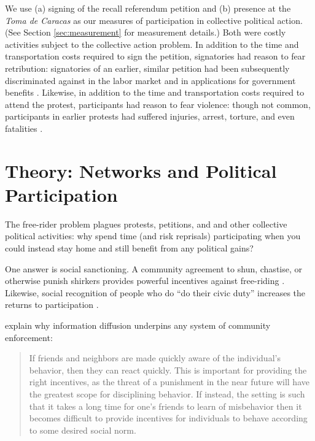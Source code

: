 \documentclass[12pt]{article}
\begin{document}
We use (a) signing of the recall referendum petition and (b) presence at the \emph{Toma de Caracas} as our measures of participation in collective political action. (See Section \ref{sec:measurement} for measurement details.) Both were costly activities subject to the collective action problem. In addition to the time and transportation costs required to sign the petition, signatories had reason to fear retribution: signatories of an earlier, similar petition had been subsequently discriminated against in the labor market \citep{Maisanta} and in applications for government benefits \citep{AlbertusMaisanta}. Likewise, in addition to the time and transportation costs required to attend the protest, participants had reason to fear violence: though not common, participants in earlier protests had suffered injuries, arrest, torture, and even fatalities \citep{Toro2014}.










\section{Theory: Networks and Political Participation}\label{sec:literature}

The free-rider problem plagues protests, petitions, and and other collective political activities: why spend time (and risk reprisals) participating when you could instead stay home and still benefit from any political gains?

One answer is social sanctioning. A community agreement to shun, chastise, or otherwise punish shirkers provides powerful incentives against free-riding \citep{Ostrom:1990ws,Kandori:1992fk,Fearon:2007wp}. Likewise, social recognition of people who do ``do their civic duty'' increases the returns to participation \citep{Sinclair:2012tq}.

\citet[][75]{JacksonJEL} explain why information diffusion underpins any system of community enforcement:

\linespread{1}\selectfont
\begingroup
\addtolength\leftmargini{-0.1in}
\begin{quote}
 If friends and neighbors are made quickly aware of the individual's behavior, then they can react quickly. This is important for providing the right incentives, as the threat of a punishment in the near future will have the greatest scope for disciplining behavior. If instead, the setting is such that it takes a long time for one's friends to learn of misbehavior then it becomes difficult to provide incentives for individuals to behave according to some desired social norm.
\end{quote}
\linespread{1.1}\selectfont
\end{document}
